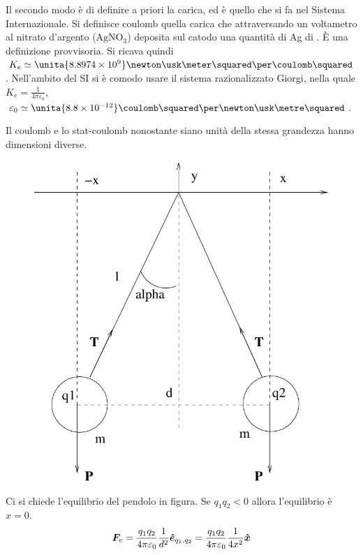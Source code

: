 Il secondo modo è di definire a priori la carica, ed è quello che si fa nel Sistema Internazionale. Si definisce coulomb quella carica che attraversando un voltametro al nitrato d'argento ($\mathrm{AgNO_3}$) deposita sul catodo una quantità di Ag di  \gram. \`E una definizione provvisoria. Si ricava quindi $K_e\simeq \unita{8.8974\times 10^9}\newton\usk\meter\squared\per\coulomb\squared$. Nell'ambito del SI si è comodo usare il sistema razionalizzato Giorgi, nella quale $K_e=\frac{1}{4\pi\varepsilon_0}$, $\varepsilon_0\simeq \unita{8.8\times 10^{-12}}\coulomb\squared\per\newton\usk\metre\squared$.

Il coulomb e lo stat-coulomb nonostante siano unità della stessa grandezza hanno dimensioni diverse.
\begin{Es}
\begin{figure}[htbp]
\centering
\includegraphics[scale=0.5]{immagini/fisica2/pendolo_carico}
\end{figure}
\end{Es}
Ci si chiede l'equilibrio del pendolo in figura. Se $q_1q_2<0$ allora l'equilibrio è $x=0$.
\begin{equation*}\boldsymbol{F}_e=\frac{q_1q_2}{4\pi\varepsilon_0}\frac{1}{d^2}\boldsymbol{\hat {e}}_{q_1,q_2}=\frac{q_1q_2}{4\pi\varepsilon_0}\frac{1}{4x^2}\boldsymbol{\hat {x}}\end{equation*}
